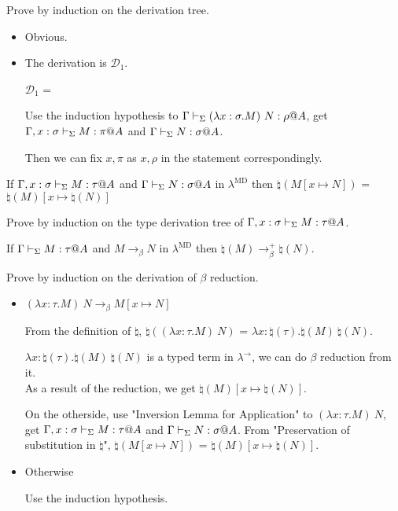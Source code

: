 Prove by induction on the derivation tree.

\begin{itemize}
	\item \TApp
	      	      
	      Obvious.
	      	      
	\item \TConv
	      	      
	      The derivation is $\mathcal{D}_1$.
	      	      
	      $\mathcal{D}_1$ = 
	      { \andalso {}}
	      	      
	      Use the induction hypothesis to $\G \V (\lambda x:\sigma.M)\ N: \rho@A$, get $\Gamma, x:\sigma \vdash_\Sigma M : \pi @A$ and $\Gamma \vdash_\Sigma N:\sigma @ A$.
	      	      
	      Then we can fix $x, \pi$ as $x, \rho$ in the statement correspondingly.
	      	      
\end{itemize}

\begin{lemma}
	If $\G, x:\sigma \V M:\tau@A$ and $\G \V N:\sigma@A$ in $\lambda^{\text{MD}}$
	then $\natural(M[x \mapsto N])$ = $\natural(M)[x\mapsto\natural(N)]$
\end{lemma}

Prove by induction on the type derivation tree of $\G, x:\sigma \V M:\tau@A$.

\begin{lemma}
	If $\G \V M:\tau@A$ and $M \longrightarrow_\beta N$ in $\lambda^{\text{MD}}$
	then $\natural(M) \longrightarrow_\beta^+ \natural(N)$.
\end{lemma}

Prove by induction on the derivation of $\beta$ reduction.

\begin{itemize}
	\newcommand{\R}{\longrightarrow_{\beta}}
	\item $(\lambda x:\tau.M)\ N \R M[x \mapsto N]$
	      	      
	      From the definition of $\natural$, $\natural((\lambda x:\tau.M)\ N)$ = $\lambda x:\natural(\tau).\natural(M)\ \natural(N)$.
	      	      
	      $\lambda x:\natural(\tau).\natural(M)\ \natural(N)$ is a typed term in $\lambda^\to$, we can do $\beta$ reduction from it.\\
	      As a result of the reduction, we get $\natural(M)[x\mapsto\natural(N)]$.
	      	      
	      On the otherside, use "Inversion Lemma for Application" to $(\lambda x:\tau.M)\ N$, get $\G, x:\sigma \V M:\tau@A$ and $\G \V N:\sigma@A$.
	      From "Preservation of substitution in $\natural$", $\natural(M[x \mapsto N])$ = $\natural(M)[x\mapsto\natural(N)]$.
	      	      
	\item Otherwise
	      	      
	      Use the induction hypothesis.
\end{itemize}

